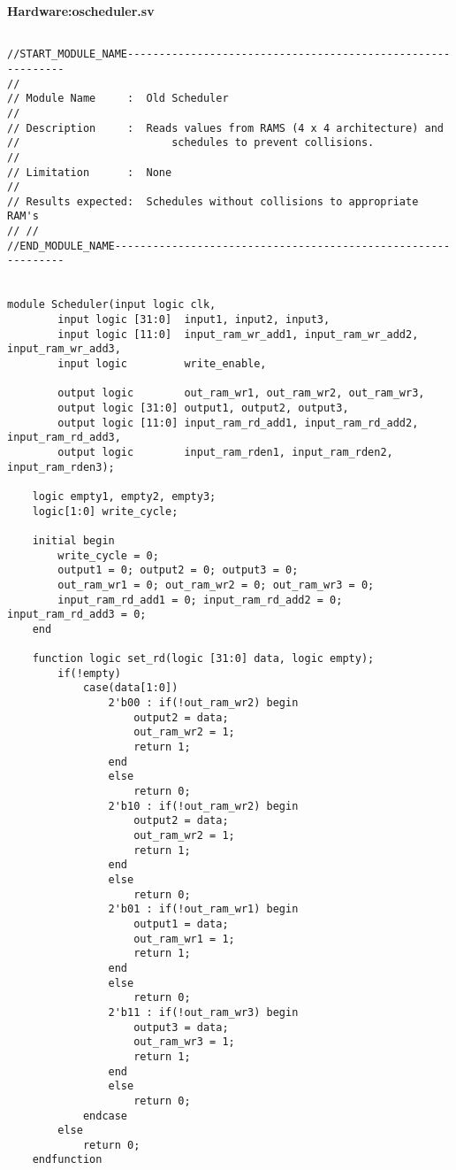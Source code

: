 \documentclass[twoside,12pt,fleqn]{book} %
\begin{document}
\newpage
\textbf{Hardware:oscheduler.sv}
\begin{lstlisting}

//START_MODULE_NAME------------------------------------------------------------
//
// Module Name     :  Old Scheduler
//
// Description     :  Reads values from RAMS (4 x 4 architecture) and       //                        schedules to prevent collisions.
//
// Limitation      :  None
// 
// Results expected:  Schedules without collisions to appropriate RAM's
// //
//END_MODULE_NAME--------------------------------------------------------------


module Scheduler(input logic clk,
        input logic [31:0]  input1, input2, input3,
        input logic [11:0]  input_ram_wr_add1, input_ram_wr_add2, input_ram_wr_add3,
        input logic         write_enable,

        output logic        out_ram_wr1, out_ram_wr2, out_ram_wr3,
        output logic [31:0] output1, output2, output3,
        output logic [11:0] input_ram_rd_add1, input_ram_rd_add2, input_ram_rd_add3,
        output logic        input_ram_rden1, input_ram_rden2, input_ram_rden3); 
    
    logic empty1, empty2, empty3;
    logic[1:0] write_cycle;

    initial begin
        write_cycle = 0;
        output1 = 0; output2 = 0; output3 = 0;
        out_ram_wr1 = 0; out_ram_wr2 = 0; out_ram_wr3 = 0;
        input_ram_rd_add1 = 0; input_ram_rd_add2 = 0; input_ram_rd_add3 = 0;
    end

    function logic set_rd(logic [31:0] data, logic empty);
        if(!empty)
            case(data[1:0])
                2'b00 : if(!out_ram_wr2) begin
                    output2 = data;
                    out_ram_wr2 = 1;
                    return 1;
                end
                else
                    return 0;
                2'b10 : if(!out_ram_wr2) begin
                    output2 = data;
                    out_ram_wr2 = 1;
                    return 1;
                end
                else
                    return 0;
                2'b01 : if(!out_ram_wr1) begin
                    output1 = data;
                    out_ram_wr1 = 1;
                    return 1;
                end
                else
                    return 0;
                2'b11 : if(!out_ram_wr3) begin
                    output3 = data;
                    out_ram_wr3 = 1;
                    return 1;
                end
                else
                    return 0;
            endcase
        else
            return 0;
    endfunction


\end{lstlisting}
\end{document}

